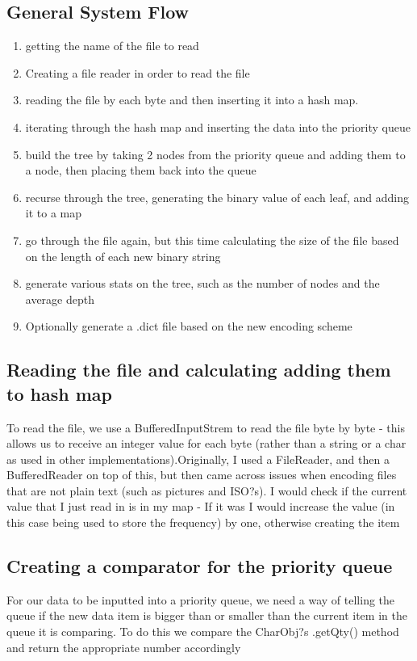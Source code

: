 \documentclass[11pt, oneside]{amsart}
\begin{document}
	\subsection{General System Flow}
		\begin{enumerate}
			\item getting the name of the file to read
			\item Creating a file reader in order to read the file
			\item reading the file by each byte and then inserting it into a hash map.
			\item iterating through the hash map and inserting the data into the priority queue
			\item build the tree by taking 2 nodes from the priority queue and adding them to a node, then placing them back into the queue
			\item recurse through the tree, generating the binary value of each leaf, and adding it to a map
			\item go through the file again, but this time calculating the size of the file based on the length of each new binary string
			\item generate various stats on the tree, such as the number of nodes and the
		average depth
			\item Optionally generate a .dict file based on the new encoding scheme
		\end{enumerate}
	\subsection{Reading the file and calculating adding them to hash map}
		To read the file, we use a BufferedInputStrem to read the file byte by byte - this allows us to receive an integer value for each byte (rather than a string or a char as used in other implementations).Originally, I used a FileReader, and then a BufferedReader on top of this, but then came across issues when encoding files that are not plain text (such as pictures and ISO?s). I would check if the current value that I just read in is in my map - If it was I would increase the value (in this case being used to store the frequency) by one, otherwise creating the item
	\subsection{Creating a comparator for the priority queue}
		For our data to be inputted into a priority queue, we need a way of telling the queue if the new data item is bigger than or smaller than the current item in the queue it is comparing. To do this we compare the CharObj?s .getQty() method and return the appropriate number accordingly
\end{document}
